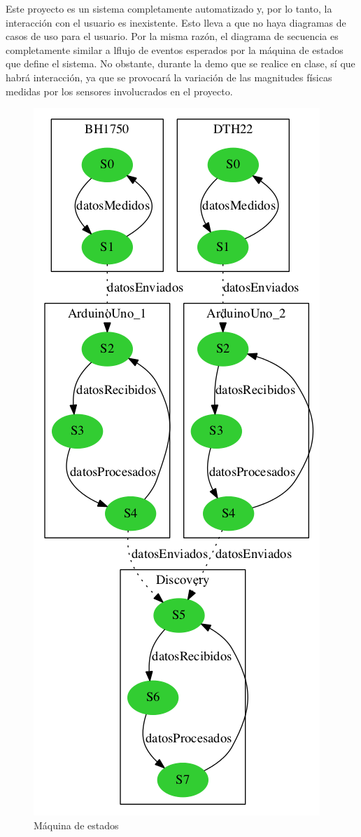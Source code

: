 Este proyecto es un sistema completamente automatizado y, por lo
tanto, la interacci\'on con el usuario es inexistente. Esto lleva a
que no haya diagramas de casos de uso para el usuario. Por la misma
raz\'on, el diagrama de secuencia es completamente similar a lflujo de
eventos esperados por la m\'aquina de estados que define el sistema.
No obstante, durante la demo que se realice en clase, s\'i que habr\'a
interacci\'on, ya que se provocar\'a la variaci\'on de las magnitudes
f\'isicas medidas por los sensores involucrados en el proyecto.
\begin{center}
\begin{figure}[h]\label{fig:statemachine}
\hspace{3.5cm}
\includegraphics[scale=0.5]{images/maquina_estados.png}
\caption{M\'aquina de estados}
\end{figure}
\end{center}
